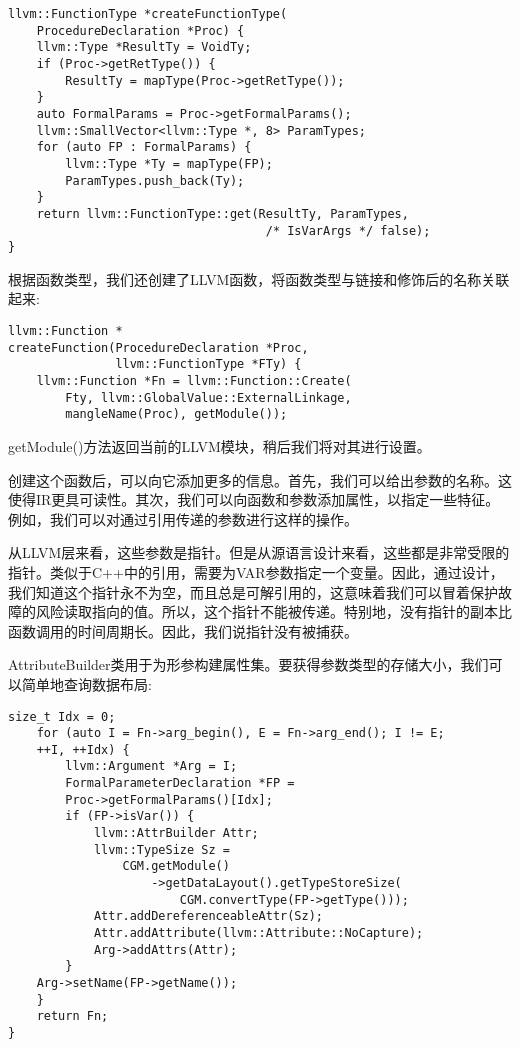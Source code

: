 \begin{lstlisting}[caption={}]
llvm::FunctionType *createFunctionType(
	ProcedureDeclaration *Proc) {
	llvm::Type *ResultTy = VoidTy;
	if (Proc->getRetType()) {
		ResultTy = mapType(Proc->getRetType());
	}
	auto FormalParams = Proc->getFormalParams();
	llvm::SmallVector<llvm::Type *, 8> ParamTypes;
	for (auto FP : FormalParams) {
		llvm::Type *Ty = mapType(FP);
		ParamTypes.push_back(Ty);
	}
	return llvm::FunctionType::get(ResultTy, ParamTypes,
									/* IsVarArgs */ false);
}
\end{lstlisting}

根据函数类型，我们还创建了LLVM函数，将函数类型与链接和修饰后的名称关联起来:\par

\begin{lstlisting}[caption={}]
llvm::Function *
createFunction(ProcedureDeclaration *Proc,
			   llvm::FunctionType *FTy) {
	llvm::Function *Fn = llvm::Function::Create(
		Fty, llvm::GlobalValue::ExternalLinkage,
		mangleName(Proc), getModule());
\end{lstlisting}

getModule()方法返回当前的LLVM模块，稍后我们将对其进行设置。\par

创建这个函数后，可以向它添加更多的信息。首先，我们可以给出参数的名称。这使得IR更具可读性。其次，我们可以向函数和参数添加属性，以指定一些特征。例如，我们可以对通过引用传递的参数进行这样的操作。\par

从LLVM层来看，这些参数是指针。但是从源语言设计来看，这些都是非常受限的指针。类似于C++中的引用，需要为VAR参数指定一个变量。因此，通过设计，我们知道这个指针永不为空，而且总是可解引用的，这意味着我们可以冒着保护故障的风险读取指向的值。所以，这个指针不能被传递。特别地，没有指针的副本比函数调用的时间周期长。因此，我们说指针没有被捕获。\par

AttributeBuilder类用于为形参构建属性集。要获得参数类型的存储大小，我们可以简单地查询数据布局:\par

\begin{lstlisting}[caption={}]
	size_t Idx = 0;
	for (auto I = Fn->arg_begin(), E = Fn->arg_end(); I != E;
	++I, ++Idx) {
		llvm::Argument *Arg = I;
		FormalParameterDeclaration *FP =
		Proc->getFormalParams()[Idx];
		if (FP->isVar()) {
			llvm::AttrBuilder Attr;
			llvm::TypeSize Sz =
				CGM.getModule()
					->getDataLayout().getTypeStoreSize(
						CGM.convertType(FP->getType()));
			Attr.addDereferenceableAttr(Sz);
			Attr.addAttribute(llvm::Attribute::NoCapture);
			Arg->addAttrs(Attr);
		}
	Arg->setName(FP->getName());
	}
	return Fn;
}
\end{lstlisting}


